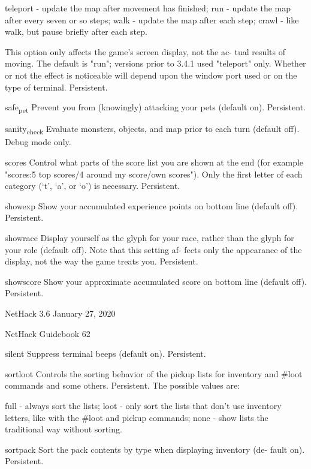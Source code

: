 \documentclass[11pt]{article}
\begin{document}
teleport - update the map after movement has finished;
run   - update the map after every seven or so steps;
walk   - update the map after each step;
crawl  - like walk, but pause briefly after each step.

This option only affects the game's screen display, not the ac-
tual results of moving. The default is "run"; versions prior
to 3.4.1 used "teleport" only. Whether or not the effect is
noticeable will depend upon the window port used or on the type
of terminal. Persistent.

safe\textsubscript{pet}
 Prevent you from (knowingly) attacking your pets (default on).
 Persistent.

sanity\textsubscript{check}
 Evaluate monsters, objects, and map prior to each turn (default
 off). Debug mode only.

scores
 Control what parts of the score list you are shown at the end
 (for  example "scores:5 top scores/4 around my score/own
 scores"). Only the first letter of each category (`t', `a', or
 `o') is necessary. Persistent.

showexp
 Show your accumulated experience points on bottom line (default
 off). Persistent.

showrace
 Display yourself as the glyph for your race, rather than the
 glyph for your role (default off). Note that this setting af-
 fects only the appearance of the display, not the way the game
 treats you. Persistent.

showscore
 Show your approximate accumulated score on bottom line (default
 off). Persistent.


NetHack 3.6                   January 27, 2020





NetHack Guidebook                       62



silent
 Suppress terminal beeps (default on). Persistent.

sortloot
 Controls the sorting behavior of the pickup lists for inventory
 and \#loot commands and some others. Persistent. The possible
 values are:

full - always sort the lists;
loot - only sort the lists that don't use inventory letters,
    like with the \#loot and pickup commands;
none - show lists the traditional way without sorting.

sortpack
 Sort the pack contents by type when displaying inventory (de-
 fault on). Persistent.
\end{document}
